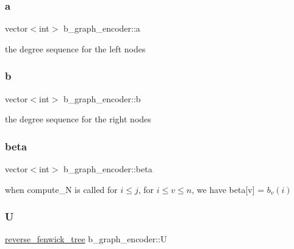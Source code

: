 \subsubsection{\texorpdfstring{a}{a}}
{\footnotesize\ttfamily vector$<$int$>$ b\+\_\+graph\+\_\+encoder\+::a\hspace{0.3cm}{\ttfamily [private]}}



the degree sequence for the left nodes 

\mbox{\label{classb__graph__encoder_a767826e268702e45ab71565e096a52b8}} 
\subsubsection{\texorpdfstring{b}{b}}
{\footnotesize\ttfamily vector$<$int$>$ b\+\_\+graph\+\_\+encoder\+::b\hspace{0.3cm}{\ttfamily [private]}}



the degree sequence for the right nodes 

\mbox{\label{classb__graph__encoder_ae54d76cc4cee399d98951f870897a144}} 
\subsubsection{\texorpdfstring{beta}{beta}}
{\footnotesize\ttfamily vector$<$int$>$ b\+\_\+graph\+\_\+encoder\+::beta\hspace{0.3cm}{\ttfamily [private]}}



when compute\+\_\+N is called for $i \leq j$, for $ i \leq v \leq n$, we have beta\mbox{[}v\mbox{]} = $b_v(i)$ 

\mbox{\label{classb__graph__encoder_ac810138443002a2b2cf579ced2dc34ce}} 
\subsubsection{\texorpdfstring{U}{U}}
{\footnotesize\ttfamily \hyperlink{classreverse__fenwick__tree}{reverse\+\_\+fenwick\+\_\+tree} b\+\_\+graph\+\_\+encoder\+::U\hspace{0.3cm}{\ttfamily [private]}}



